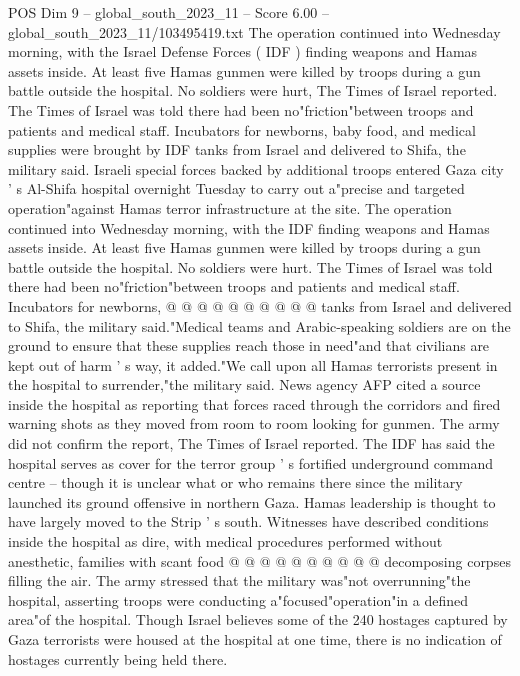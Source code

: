 \begin{textsample}{POS Dim 9 – global\_south\_2023\_11 – Score 6.00 – global\_south\_2023\_11/103495419.txt}  \label{ex:f9_pos_026}
The operation continued into Wednesday morning, with the Israel Defense Forces ( IDF ) finding weapons and Hamas assets inside.
At least five Hamas gunmen were killed by troops during a gun battle outside the hospital.
No soldiers were hurt, The Times of Israel reported.
The Times of Israel was told there had been no"friction"between troops and patients and medical staff.
Incubators for newborns, baby food, and medical supplies were brought by IDF tanks from Israel and delivered to Shifa, the military said.
Israeli special forces backed by additional troops entered Gaza city ' s Al-Shifa hospital overnight Tuesday to carry out a"precise and targeted operation"against Hamas terror infrastructure at the site.
The operation continued into Wednesday morning, with the IDF finding weapons and Hamas assets inside.
At least five Hamas gunmen were killed by troops during a gun battle outside the hospital.
No soldiers were hurt.
The Times of Israel was told there had been no"friction"between troops and patients and medical staff.
Incubators for newborns, @ @ @ @ @ @ @ @ @ @ tanks from Israel and delivered to Shifa, the military said."Medical teams and Arabic-speaking soldiers are on the ground to ensure that these supplies reach those in need"and that civilians are kept out of harm ' s way, it added."We call upon all Hamas terrorists present in the hospital to surrender,"the military said.
News agency AFP cited a source inside the hospital as reporting that forces raced through the corridors and fired warning shots as they moved from room to room looking for gunmen.
The army did not confirm the report, The Times of Israel reported.
The IDF has said the hospital serves as cover for the terror group ' s fortified underground command centre -- though it is unclear what or who remains there since the military launched its ground offensive in northern Gaza.
Hamas leadership is thought to have largely moved to the Strip ' s south.
Witnesses have described conditions inside the hospital as dire, with medical procedures performed without anesthetic, families with scant food @ @ @ @ @ @ @ @ @ @ decomposing corpses filling the air.
The army stressed that the military was"not overrunning"the hospital, asserting troops were conducting a"focused"operation"in a defined area"of the hospital.
Though Israel believes some of the 240 hostages captured by Gaza terrorists were housed at the hospital at one time, there is no indication of hostages currently being held there.

\end{textsample}
